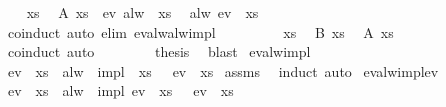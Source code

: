 \begin{isabellebody}
%
\isadelimproof
%
\endisadelimproof
%
\isatagproof
{}\isamarkupfalse%
{\isacharminus}\isanewline
\ \ \isacommand{{\isacharbraceleft}}\isamarkupfalse%
\isamarkupfalse%
\ xs\ \isamarkupfalse%
\ {\isachardoublequoteopen}{\isacharquery}A\ xs\ {\isasymand}\ ev\ {\isacharparenleft}alw\ {\isasymphi}{\isacharparenright}\ xs{\isachardoublequoteclose}\ \isamarkupfalse%
\ {\isachardoublequoteopen}alw\ {\isacharparenleft}ev\ {\isasympsi}{\isacharparenright}\ xs{\isachardoublequoteclose}\isanewline
\ \ \ \ \isamarkupfalse%
\ coinduct\ {\isacharparenleft}auto\ elim{\isacharcolon}\ ev{\isacharunderscore}alw{\isacharunderscore}alw{\isacharunderscore}impl{\isacharparenright}\isanewline
\ \ \isacommand{{\isacharbraceright}}\isamarkupfalse%
\isanewline
\ \ \isamarkupfalse%
\isanewline
\ \ \isacommand{{\isacharbraceleft}}\isamarkupfalse%
\isamarkupfalse%
\ xs\ \isamarkupfalse%
\ {\isachardoublequoteopen}{\isacharquery}B\ xs{\isachardoublequoteclose}\ \isamarkupfalse%
\ {\isachardoublequoteopen}{\isacharquery}A\ xs{\isachardoublequoteclose}\isanewline
\ \ \ \isamarkupfalse%
\ coinduct\ auto\isanewline
\ \ \isacommand{{\isacharbraceright}}\isamarkupfalse%
\isanewline
\ \ \isamarkupfalse%
\ \isamarkupfalse%
\ {\isacharquery}thesis\ \isamarkupfalse%
\ blast\isanewline
{}\isamarkupfalse%
%
\endisatagproof
{\isafoldproof}%
%
\isadelimproof
\isanewline
%
\endisadelimproof
\isanewline
{}\isamarkupfalse%
\ ev{\isacharunderscore}alw{\isacharunderscore}impl{\isacharcolon}\isanewline
{}\ {\isachardoublequoteopen}ev\ {\isasymphi}\ xs{\isachardoublequoteclose}\ \ {\isachardoublequoteopen}alw\ {\isacharparenleft}{\isasymphi}\ impl\ {\isasympsi}{\isacharparenright}\ xs{\isachardoublequoteclose}\ \ \ {\isachardoublequoteopen}ev\ {\isasympsi}\ xs{\isachardoublequoteclose}\isanewline
%
\isadelimproof
%
\endisadelimproof
%
\isatagproof
{}\isamarkupfalse%
\ assms\ \isamarkupfalse%
\ induct\ auto%
\endisatagproof
{\isafoldproof}%
%
\isadelimproof
\isanewline
%
\endisadelimproof
\isanewline
{}\isamarkupfalse%
\ ev{\isacharunderscore}alw{\isacharunderscore}impl{\isacharunderscore}ev{\isacharcolon}\isanewline
{}\ {\isachardoublequoteopen}ev\ {\isasymphi}\ xs{\isachardoublequoteclose}\ \ {\isachardoublequoteopen}alw\ {\isacharparenleft}{\isasymphi}\ impl\ ev\ {\isasympsi}{\isacharparenright}\ xs{\isachardoublequoteclose}\ \ \ {\isachardoublequoteopen}ev\ {\isasympsi}\ xs{\isachardoublequoteclose}\isanewline

\end{isabellebody}
